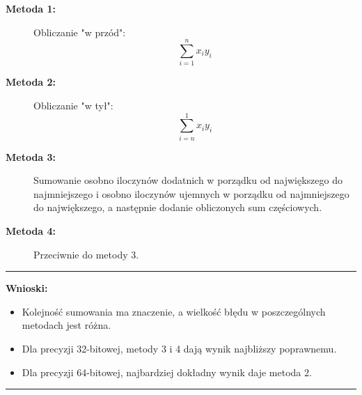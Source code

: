 \documentclass{article}
\begin{document}
\begin{description}
    \item[\textbf{Metoda 1:}] Obliczanie "w przód":
    \[ \sum_{i=1}^{n} x_i y_i \]

    \item[\textbf{Metoda 2:}] Obliczanie "w tył":
    \[ \sum_{i=n}^{1} x_i y_i \]

    \item[\textbf{Metoda 3:}] Sumowanie osobno iloczynów dodatnich w porządku od największego do najmniejszego i osobno iloczynów ujemnych w porządku od najmniejszego do największego, a następnie dodanie obliczonych sum częściowych.

    \item[\textbf{Metoda 4:}] Przeciwnie do metody 3.
\end{description}

\vspace{0.5cm}

\noindent\rule{\textwidth}{0.4pt}
\textbf{Wnioski:}
\begin{itemize}
    \item Kolejność sumowania ma znaczenie, a wielkość błędu w poszczególnych metodach jest różna.
    \item Dla precyzji 32-bitowej, metody 3 i 4 dają wynik najbliższy poprawnemu.
    \item Dla precyzji 64-bitowej, najbardziej dokładny wynik daje metoda 2.
\end{itemize}
\noindent\rule{\textwidth}{0.4pt}
\end{document}
